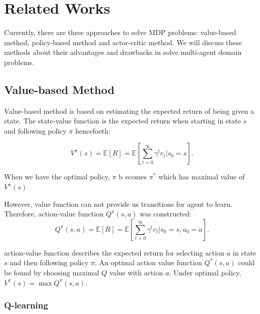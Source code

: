 \documentclass[11pt,twocolumn]{jarticle} %
\begin{document}
\section{Related Works}

Currently, there are three approaches to solve MDP problems: value-based method, policy-based method and actor-critic method. We will discuss these methods about their advantages and drawbacks in solve multi-agent domain problems.

\subsection{Value-based Method}

Value-based method is based on estimating the expected return of being given a state. The state-value function is the expected return when starting in state $s$ and following policy $\pi$ hencefoeth: 

\begin{equation}
V^\pi(s) = \mathbb{E}[R] = \mathbb{E}[\sum_{t=0}^{\infty}\gamma^t r_t | s_0 = s].
\end{equation}

When we have the optimal policy, $\pi$ b ecomes $\pi^*$ which has maximal value of $V^\pi(s)$\par
However, value function can not provide us transitions for agent to learn. Therefore, action-value function $Q^\pi(s, a)$ was constructed:
\begin{equation}
Q^\pi(s, a) = \mathbb{E}[R] = \mathbb{E}[\sum_{t=0}^{\infty}\gamma^t r_t | s_0 = s, a_0 = a]. 
\end{equation}

action-value function describes the expected return for selecting action $a$ in state $s$ and then following policy $\pi$. An optimal action value function $Q^*(s, a)$ could be found by choosing maximal $Q$ value with action $a$. Under optimal policy, $V^\pi(s) = \max{Q^\pi(s, a)}$.

\subsubsection{Q-learning\cite{qlearning}}
\end{document}
